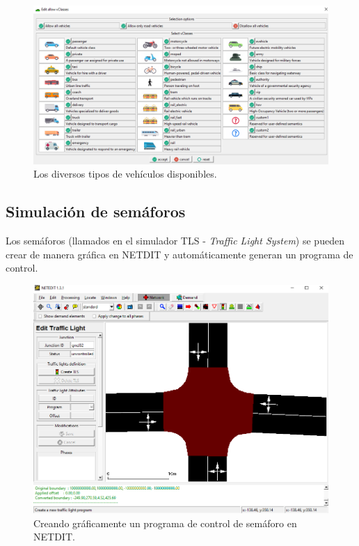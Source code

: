 \begin{figure}[H]
    \centering
\includegraphics[width=\textwidth]{sumo/d600ef6ce1de01e90d10a436d7b6bb75.png}
    \caption{Los diversos tipos de vehículos disponibles.}
    \label{fig:sumogui2}
\end{figure}

\hypertarget{simulaciuxf3n-de-semuxe1foros}{%
\subsection{Simulación de
semáforos}\label{simulaciuxf3n-de-semuxe1foros}}

Los semáforos (llamados en el simulador TLS - \emph{Traffic Light
System}) se pueden crear de manera gráfica en NETDIT y automáticamente
generan un programa de control.

\begin{figure}[H]
    \centering
\includegraphics[width=\textwidth]{sumo/d53e12f08f94d08fd7e31f214786b43e.png}
    \caption{Creando gráficamente un programa de control de semáforo en NETDIT.}
    \label{fig:netedit2}
\end{figure}

